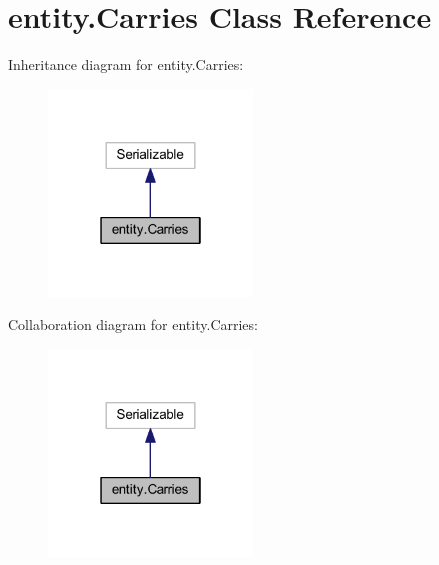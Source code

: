 \hypertarget{classentity_1_1_carries}{}\section{entity.\+Carries Class Reference}
\label{classentity_1_1_carries}


Inheritance diagram for entity.\+Carries\+:\nopagebreak
\begin{figure}[H]
\begin{center}
\leavevmode
\includegraphics[width=154pt]{classentity_1_1_carries__inherit__graph}
\end{center}
\end{figure}


Collaboration diagram for entity.\+Carries\+:\nopagebreak
\begin{figure}[H]
\begin{center}
\leavevmode
\includegraphics[width=154pt]{classentity_1_1_carries__coll__graph}
\end{center}
\end{figure}
